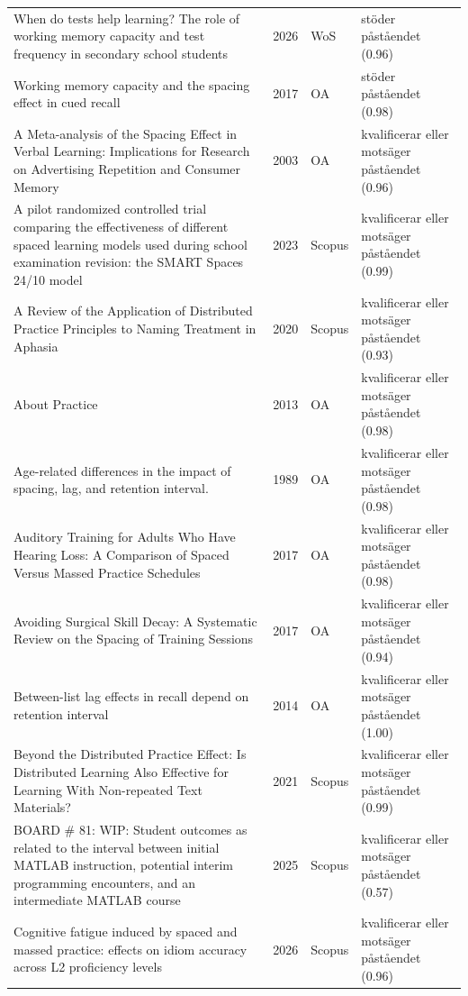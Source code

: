 \begin{longtable}{@{}%
  >{\raggedright\arraybackslash}p{}c%
  >{\raggedright\arraybackslash}p{}%
  >{\raggedright\arraybackslash}p{}@{}}
When do tests help learning? The role of working memory capacity and test frequency in secondary school students & 2026 & WoS & stöder påståendet (0.96) \\
Working memory capacity and the spacing effect in cued recall & 2017 & OA & stöder påståendet (0.98) \\
A Meta-analysis of the Spacing Effect in Verbal Learning: Implications for Research on Advertising Repetition and Consumer Memory & 2003 & OA & kvalificerar eller motsäger påståendet (0.96) \\
A pilot randomized controlled trial comparing the effectiveness of different spaced learning models used during school examination revision: the SMART Spaces 24/10 model & 2023 & Scopus & kvalificerar eller motsäger påståendet (0.99) \\
A Review of the Application of Distributed Practice Principles to Naming Treatment in Aphasia & 2020 & Scopus & kvalificerar eller motsäger påståendet (0.93) \\
About Practice & 2013 & OA & kvalificerar eller motsäger påståendet (0.98) \\
Age-related differences in the impact of spacing, lag, and retention interval. & 1989 & OA & kvalificerar eller motsäger påståendet (0.98) \\
Auditory Training for Adults Who Have Hearing Loss: A Comparison of Spaced Versus Massed Practice Schedules & 2017 & OA & kvalificerar eller motsäger påståendet (0.98) \\
Avoiding Surgical Skill Decay: A Systematic Review on the Spacing of Training Sessions & 2017 & OA & kvalificerar eller motsäger påståendet (0.94) \\
Between-list lag effects in recall depend on retention interval & 2014 & OA & kvalificerar eller motsäger påståendet (1.00) \\
Beyond the Distributed Practice Effect: Is Distributed Learning Also Effective for Learning With Non-repeated Text Materials? & 2021 & Scopus & kvalificerar eller motsäger påståendet (0.99) \\
BOARD \# 81: WIP: Student outcomes as related to the interval between initial MATLAB instruction, potential interim programming encounters, and an intermediate MATLAB course & 2025 & Scopus & kvalificerar eller motsäger påståendet (0.57) \\
Cognitive fatigue induced by spaced and massed practice: effects on idiom accuracy across L2 proficiency levels & 2026 & Scopus & kvalificerar eller motsäger påståendet (0.96) \\

\end{longtable}
